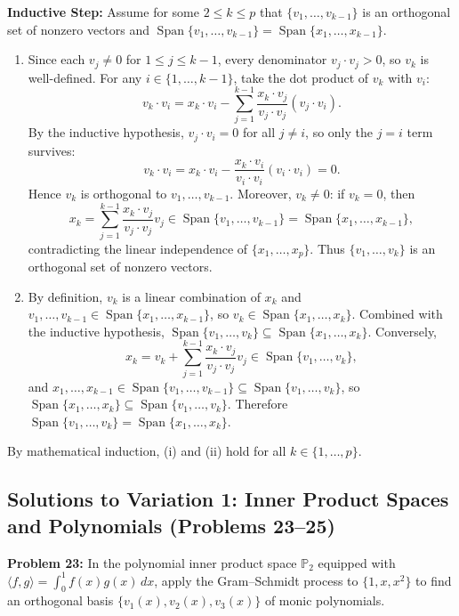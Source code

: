 \documentclass[11pt, letterpaper]{article}
\theoremstyle{definition}
\theoremstyle{remark}
\begin{document}
\textbf{Inductive Step:} Assume for some $2 \le k \le p$ that $\{v_1, \dots, v_{k-1}\}$ is an orthogonal set of nonzero vectors and $\operatorname{Span}\{v_1, \dots, v_{k-1}\} = \operatorname{Span}\{x_1, \dots, x_{k-1}\}$.
\begin{enumerate}[label=(\roman*)]
    \item Since each $v_j \neq 0$ for $1 \le j \le k-1$, every denominator $v_j \cdot v_j > 0$, so $v_k$ is well-defined. For any $i \in \{1, \dots, k-1\}$, take the dot product of $v_k$ with $v_i$:
    \[
        v_k \cdot v_i = x_k \cdot v_i - \sum_{j=1}^{k-1} \frac{x_k \cdot v_j}{v_j \cdot v_j} (v_j \cdot v_i).
    \]
    By the inductive hypothesis, $v_j \cdot v_i = 0$ for all $j \neq i$, so only the $j = i$ term survives:
    \[
        v_k \cdot v_i = x_k \cdot v_i - \frac{x_k \cdot v_i}{v_i \cdot v_i}(v_i \cdot v_i) = 0.
    \]
    Hence $v_k$ is orthogonal to $v_1, \dots, v_{k-1}$. Moreover, $v_k \neq 0$: if $v_k = 0$, then
    \[
        x_k = \sum_{j=1}^{k-1} \frac{x_k \cdot v_j}{v_j \cdot v_j} v_j \in \operatorname{Span}\{v_1, \dots, v_{k-1}\} = \operatorname{Span}\{x_1, \dots, x_{k-1}\},
    \]
    contradicting the linear independence of $\{x_1, \dots, x_p\}$. Thus $\{v_1, \dots, v_k\}$ is an orthogonal set of nonzero vectors.
    \item By definition, $v_k$ is a linear combination of $x_k$ and $v_1, \dots, v_{k-1} \in \operatorname{Span}\{x_1, \dots, x_{k-1}\}$, so $v_k \in \operatorname{Span}\{x_1, \dots, x_k\}$. Combined with the inductive hypothesis, $\operatorname{Span}\{v_1, \dots, v_k\} \subseteq \operatorname{Span}\{x_1, \dots, x_k\}$. Conversely,
    \[
        x_k = v_k + \sum_{j=1}^{k-1} \frac{x_k \cdot v_j}{v_j \cdot v_j} v_j \in \operatorname{Span}\{v_1, \dots, v_k\},
    \]
    and $x_1, \dots, x_{k-1} \in \operatorname{Span}\{v_1, \dots, v_{k-1}\} \subseteq \operatorname{Span}\{v_1, \dots, v_k\}$, so $\operatorname{Span}\{x_1, \dots, x_k\} \subseteq \operatorname{Span}\{v_1, \dots, v_k\}$. Therefore $\operatorname{Span}\{v_1, \dots, v_k\} = \operatorname{Span}\{x_1, \dots, x_k\}$.
\end{enumerate}
By mathematical induction, (i) and (ii) hold for all $k \in \{1, \dots, p\}$.

\subsection{Solutions to Variation 1: Inner Product Spaces and Polynomials (Problems 23--25)}

\textbf{Problem 23:} In the polynomial inner product space $\mathbb{P}_2$ equipped with $\langle f, g \rangle = \int_0^1 f(x) g(x)\,dx$, apply the Gram--Schmidt process to $\{1, x, x^2\}$ to find an orthogonal basis $\{v_1(x), v_2(x), v_3(x)\}$ of monic polynomials.
\end{document}
